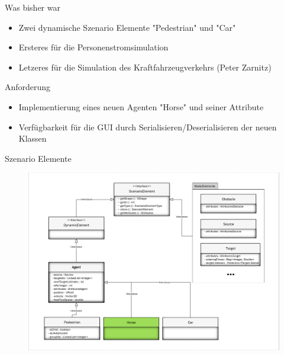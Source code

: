 \begin{frame}{Was bisher war}
	\begin{itemize}
		\item Zwei dynamische Szenario Elemente "Pedestrian" und "Car"
		\item Ersteres für die Personenstromsimulation
		\item Letzeres für die Simulation des Kraftfahrzeugverkehrs (Peter Zarnitz) \cite{zarnitz-2015}
	\end{itemize}
\end{frame}

\begin{frame}{Anforderung}
	\begin{itemize}
		\item Implementierung eines neuen Agenten "Horse" und seiner Attribute
		\item Verfügbarkeit für die GUI durch Serialisieren/Deserialisieren der neuen Klassen
	\end{itemize}
\end{frame}

\begin{frame}{Szenario Elemente}
	\begin{figure}
		\includegraphics[width=\textwidth, keepaspectratio]{appendix/uml/ScenarioElements.pdf}
	\end{figure}
\end{frame}

